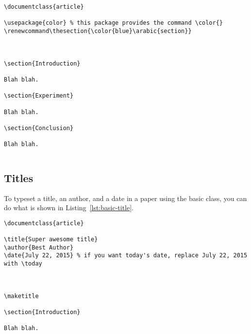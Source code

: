 \begin{listing}[htbp]
	\centering
	\begin{verbatim}
\documentclass{article}

\usepackage{color} % this package provides the command \color{}
\renewcommand\thesection{\color{blue}\arabic{section}}



\section{Introduction}

Blah blah.

\section{Experiment}

Blah blah.

\section{Conclusion}

Blah blah.


	\end{verbatim}
	\caption{Example of semantic markup in \LaTeX{} for section headings}
	\label{lst:blue-sections}
\end{listing}

\subsection{Titles}
\label{subsec:titles}

To typeset a title, an author, and a date in a paper using the basic  class, you can do what is shown in Listing~\ref{lst:basic-title}.

\begin{listing}[htbp]
	\centering
	\begin{verbatim}
\documentclass{article}

\title{Super awesome title}
\author{Best Author}
\date{July 22, 2015} % if you want today's date, replace July 22, 2015 with \today



\maketitle

\section{Introduction}

Blah blah.


	\end{verbatim}
	\caption{A basic example of how to typeset the title of a paper using the  class}
	\label{lst:basic-title}
\end{listing}

